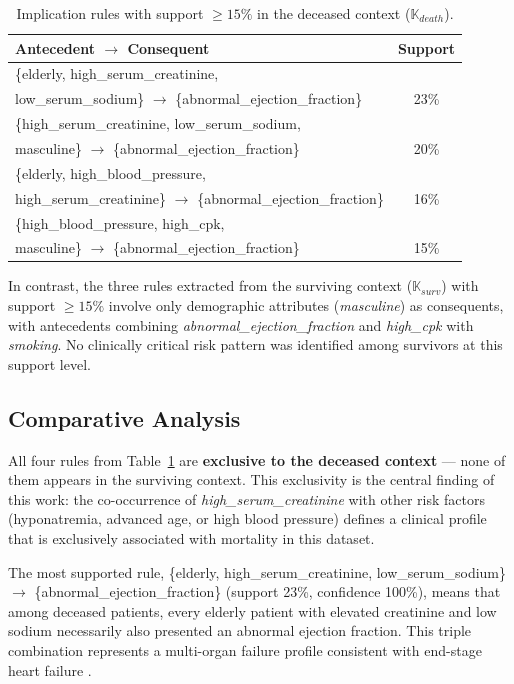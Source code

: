 \documentclass[a4paper,twoside]{article}
\begin{document}
\begin{table}[h]
\caption{Implication rules with support $\geq 15\%$ in the deceased context ($\mathbb{K}_{death}$).}
\label{tab:rules_mortos}
\centering
\small
\begin{tabular}{|l|c|}
\hline
\textbf{Antecedent $\rightarrow$ Consequent} & \textbf{Support} \\
\hline
\{elderly, high\_serum\_creatinine, & \\
\quad low\_serum\_sodium\} $\rightarrow$ \{abnormal\_ejection\_fraction\} & 23\% \\
\{high\_serum\_creatinine, low\_serum\_sodium, & \\
\quad masculine\} $\rightarrow$ \{abnormal\_ejection\_fraction\} & 20\% \\
\{elderly, high\_blood\_pressure, & \\
\quad high\_serum\_creatinine\} $\rightarrow$ \{abnormal\_ejection\_fraction\} & 16\% \\
\{high\_blood\_pressure, high\_cpk, & \\
\quad masculine\} $\rightarrow$ \{abnormal\_ejection\_fraction\} & 15\% \\
\hline
\end{tabular}
\end{table}

In contrast, the three rules extracted from the surviving context ($\mathbb{K}_{surv}$) with support $\geq 15\%$ involve only demographic attributes (\textit{masculine}) as consequents, with antecedents combining \textit{abnormal\_ejection\_fraction} and \textit{high\_cpk} with \textit{smoking}. No clinically critical risk pattern was identified among survivors at this support level.

\subsection{Comparative Analysis}

All four rules from Table~\ref{tab:rules_mortos} are \textbf{exclusive to the deceased context} — none of them appears in the surviving context. This exclusivity is the central finding of this work: the co-occurrence of \textit{high\_serum\_creatinine} with other risk factors (hyponatremia, advanced age, or high blood pressure) defines a clinical profile that is exclusively associated with mortality in this dataset.

The most supported rule, \{elderly, high\_serum\_creatinine, low\_serum\_sodium\} $\rightarrow$ \{abnormal\_ejection\_fraction\} (support 23\%, confidence 100\%), means that among deceased patients, every elderly patient with elevated creatinine and low sodium necessarily also presented an abnormal ejection fraction. This triple combination represents a multi-organ failure profile consistent with end-stage heart failure \cite{Ahmad2017}.
\end{document}
